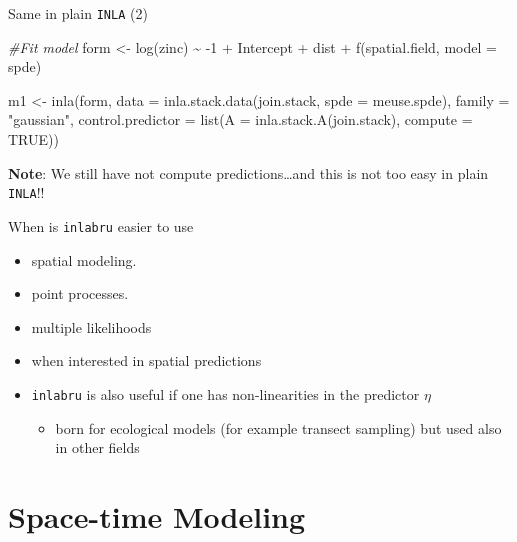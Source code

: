 \documentclass[
  ignorenonframetext,
]{beamer}
\newenvironment{Shaded}{\begin{snugshade}}{\end{snugshade}}
\newcommand{\AttributeTok}[1]{\textcolor[rgb]{0.77,0.63,0.00}{#1}}
\newcommand{\CommentTok}[1]{\textcolor[rgb]{0.56,0.35,0.01}{\textit{#1}}}
\newcommand{\ConstantTok}[1]{\textcolor[rgb]{0.00,0.00,0.00}{#1}}
\newcommand{\DecValTok}[1]{\textcolor[rgb]{0.00,0.00,0.81}{#1}}
\newcommand{\FunctionTok}[1]{\textcolor[rgb]{0.00,0.00,0.00}{#1}}
\newcommand{\NormalTok}[1]{#1}
\newcommand{\OtherTok}[1]{\textcolor[rgb]{0.56,0.35,0.01}{#1}}
\newcommand{\SpecialCharTok}[1]{\textcolor[rgb]{0.00,0.00,0.00}{#1}}
\newcommand{\StringTok}[1]{\textcolor[rgb]{0.31,0.60,0.02}{#1}}
\providecommand{\tightlist}{%
  \setlength{\itemsep}{0pt}\setlength{\parskip}{0pt}}
\begin{document}
\begin{frame}[fragile]{Same in plain \texttt{INLA} (2)}
\protect\hypertarget{same-in-plain-inla-2}{}
\tiny

\begin{Shaded}
\begin{Highlighting}[]
\CommentTok{\#Fit model}
\NormalTok{form }\OtherTok{\textless{}{-}} \FunctionTok{log}\NormalTok{(zinc) }\SpecialCharTok{\textasciitilde{}} \SpecialCharTok{{-}}\DecValTok{1} \SpecialCharTok{+}\NormalTok{ Intercept }\SpecialCharTok{+}\NormalTok{ dist }\SpecialCharTok{+} \FunctionTok{f}\NormalTok{(spatial.field, }\AttributeTok{model =}\NormalTok{ spde)}

\NormalTok{m1 }\OtherTok{\textless{}{-}} \FunctionTok{inla}\NormalTok{(form, }\AttributeTok{data =} \FunctionTok{inla.stack.data}\NormalTok{(join.stack, }\AttributeTok{spde =}\NormalTok{ meuse.spde),}
  \AttributeTok{family =} \StringTok{"gaussian"}\NormalTok{,}
  \AttributeTok{control.predictor =} \FunctionTok{list}\NormalTok{(}\AttributeTok{A =} \FunctionTok{inla.stack.A}\NormalTok{(join.stack), }\AttributeTok{compute =} \ConstantTok{TRUE}\NormalTok{))}
\end{Highlighting}
\end{Shaded}

\normalsize

\textbf{Note}: We still have not compute predictions\ldots and this is
not too easy in plain \texttt{INLA}!!
\end{frame}

\begin{frame}[fragile]{When is \texttt{inlabru} easier to use}
\protect\hypertarget{when-is-inlabru-easier-to-use}{}
\begin{itemize}
\item
  spatial modeling.
\item
  point processes.
\item
  multiple likelihoods
\item
  when interested in spatial predictions
\end{itemize}

\pause

\begin{itemize}
\item
  \texttt{inlabru} is also useful if one has non-linearities in the
  predictor \(\eta\)

  \begin{itemize}
  \tightlist
  \item
    born for ecological models (for example transect sampling) but used
    also in other fields
  \end{itemize}
\end{itemize}
\end{frame}

\hypertarget{space-time-modeling}{%
\section{Space-time Modeling}\label{space-time-modeling}}
\end{document}

